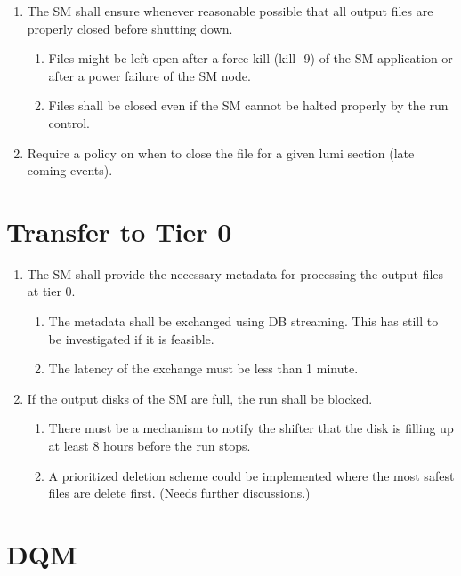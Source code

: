 \documentclass[]{article}
\begin{document}
\begin{enumerate}
\item The SM shall ensure whenever reasonable possible that all output files are properly closed before shutting down.
\begin{enumerate}
\item Files might be left open after a force kill (kill -9) of the SM application or after a power failure of the SM node.
\item Files shall be closed even if the SM cannot be halted properly by the run control.
\end{enumerate}

\item Require a policy on when to close the file for a given lumi section (late coming-events).

\end{enumerate}


\section{Transfer to Tier 0}

\begin{enumerate}

\item The SM shall provide the necessary metadata for processing the output files at tier 0.

\begin{enumerate}
\item The metadata shall be exchanged using DB streaming. 
This has still to be investigated if it is feasible.
\item The latency of the exchange must be less than 1 minute.
\end{enumerate}

\item If the output disks of the SM are full, the run shall be blocked.
\begin{enumerate}
\item There must be a mechanism to notify the shifter that the disk is filling up at least 8 hours before the run stops.
\item A prioritized deletion scheme could be implemented where the most safest files are delete first. (Needs further discussions.)
\end{enumerate}

\end{enumerate}


\section{DQM}
\end{document}
